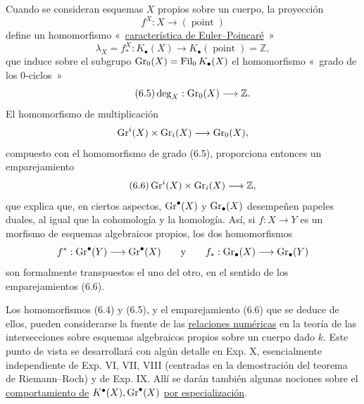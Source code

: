 Cuando se consideran esquemas $X$ propios sobre un cuerpo, la proyección
\[
f^X:X\longrightarrow(\operatorname{point})
\]
define un homomorfismo «~\uline{característica de Euler--Poincaré}~»
\begin{equation}\tag{6.4}
\lambda_X=f^X_*:K_\bullet(X)\longrightarrow K_\bullet(\operatorname{point})=\mathbb Z,
\end{equation}
que induce sobre el subgrupo $\operatorname{Gr}_0(X)=\operatorname{Fil}_0K_\bullet(X)$ el homomorfismo
«~grado de los $0$-ciclos~»
\begin{equation}\tag{6.5}
\deg_X:\operatorname{Gr}_0(X)\longrightarrow \mathbb Z.
\end{equation}
El homomorfismo de multiplicación
\[
\operatorname{Gr}^i(X)\times\operatorname{Gr}_i(X)\longrightarrow \operatorname{Gr}_0(X),
\]
compuesto con el homomorfismo de grado (6.5), proporciona entonces un
emparejamiento
\begin{equation}\tag{6.6}
\operatorname{Gr}^i(X)\times \operatorname{Gr}_i(X)\longrightarrow \mathbb Z,
\end{equation}
que explica que, en ciertos aspectos, $\operatorname{Gr}^\bullet(X)$ y $\operatorname{Gr}_\bullet(X)$
desempeñen papeles duales, al igual que la cohomología y la homología. Así,
si $f:X\to Y$ es un morfismo de esquemas algebraicos propios, los dos
homomorfismos
\[
f^*:\operatorname{Gr}^\bullet(Y)\longrightarrow \operatorname{Gr}^\bullet(X)\qquad\text{y}\qquad f_*:\operatorname{Gr}_\bullet(X)\longrightarrow \operatorname{Gr}_\bullet(Y)
\]
son formalmente transpuestos el uno del otro, en el sentido de los
emparejamientos (6.6).

Los homomorfismos (6.4) y (6.5), y el emparejamiento (6.6) que se deduce de
ellos, pueden considerarse la fuente de las \uline{relaciones numéricas} en
la teoría de las intersecciones sobre esquemas algebraicos propios sobre un
cuerpo dado $k$. Este punto de vista se desarrollará con algún detalle en
Exp. X, esencialmente independiente de Exp. VI, VII, VIII (centradas en la
demostración del teorema de Riemann--Roch) y de Exp. IX. Allí se darán
también algunas nociones sobre el \uline{comportamiento de}
$K^\bullet(X),\operatorname{Gr}^\bullet(X)$ \uline{por especialización}.

